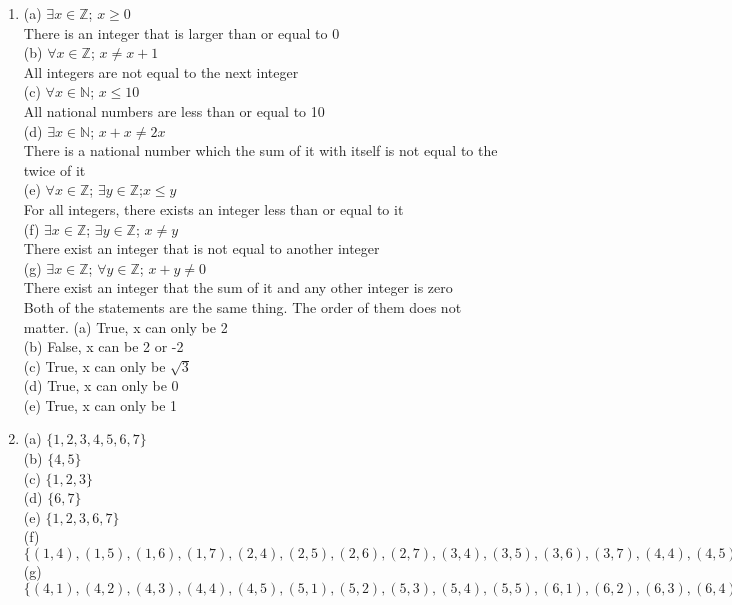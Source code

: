 \documentclass[12pt]{article}
\begin{document}
\begin{enumerate}
\item 
{}(a) $\exists x \in \mathbb{Z}$; $x \geq 0$\\ There is an integer that is larger than or equal to 0\\
(b) $\forall x \in \mathbb{Z}$; $x \neq x+1$\\ All integers are not equal to the next integer\\
(c) $\forall x \in \mathbb{N}$; $x \leq 10$\\ All national numbers are less than or equal to 10\\
(d) $\exists x \in \mathbb{N}$; $x+x \neq 2x$\\ There is a national number which the sum of it with itself is not equal to the twice of it\\
(e) $\forall x \in \mathbb{Z}$; $\exists y \in \mathbb{Z}$;$x \leq y$\\ For all integers, there exists an integer less than or equal to it\\
(f) $\exists x \in \mathbb{Z}$; $\exists y \in \mathbb{Z}$; $x \neq y$\\ There exist an integer that is not equal to another integer\\
(g)  $\exists x \in \mathbb{Z}$; $\forall y \in \mathbb{Z}$; $x+y \neq 0$\\ There exist an integer that the sum of it and any other integer is zero\\
 Both of the statements are the same thing. The order of them does not matter.
(a) True, x can only be 2\\
(b) False, x can be 2 or -2\\
(c) True, x can only be $\sqrt{3}$\\
(d) True, x can only be 0\\
(e) True, x can only be 1\\

\item
{}(a) $\{1,2,3,4,5,6,7\}$\\
(b) $\{4,5\}$\\
(c) $\{1,2,3\}$\\
(d) $\{6,7\}$\\
(e) $\{1,2,3,6,7\}$\\
(f) $\{(1,4),(1,5),(1,6),(1,7),(2,4),(2,5),(2,6),(2,7),(3,4),(3,5),(3,6),(3,7),(4,4),(4,5),(4,6),(4,7),(5,4),(5,5),(5,6),(5,7)\}$\\
(g) $\{(4,1),(4,2),(4,3),(4,4),(4,5),(5,1),(5,2),(5,3),(5,4),(5,5),(6,1),(6,2),(6,3),(6,4),(6,5),(7,1),(7,2),(7,3),(7,4),(7,5)\}$\\


\end{enumerate}
\end{document}
